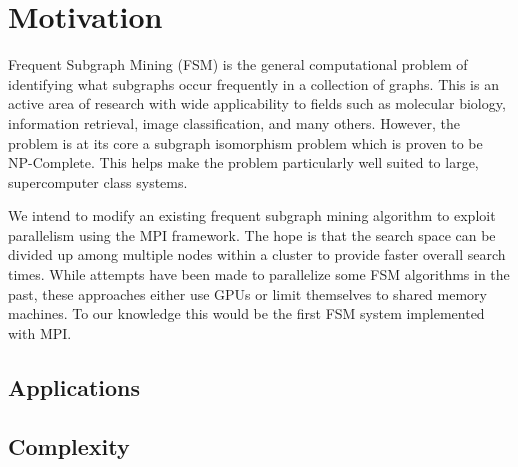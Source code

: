 \section{Motivation}
\label{sec:motivation}

Frequent Subgraph Mining (FSM) is the general computational problem of 
identifying what subgraphs occur frequently in a collection of graphs.  This 
is an active area of research with wide applicability to fields such as 
molecular biology, information retrieval, image classification, and many 
others.  However, the problem is at its core a subgraph isomorphism problem
which is proven to be NP-Complete\cite{cook1971complexity}.  This helps make
the problem particularly well suited to large, supercomputer class systems.

We intend to modify an existing frequent subgraph mining algorithm to exploit
parallelism using the MPI framework. The hope is that the search space can
be divided up among multiple nodes within a cluster to provide faster overall
search times.  While attempts have been made to parallelize some FSM 
algorithms in the past\cite{buehrer2005parallel,gspancuda}, these 
approaches either use GPUs or limit themselves to shared memory machines. 
To our knowledge this would be the first FSM system implemented with MPI.

\subsection{Applications}
\label{subsec:applications}

\subsection{Complexity}
\label{subsec:complexity}


